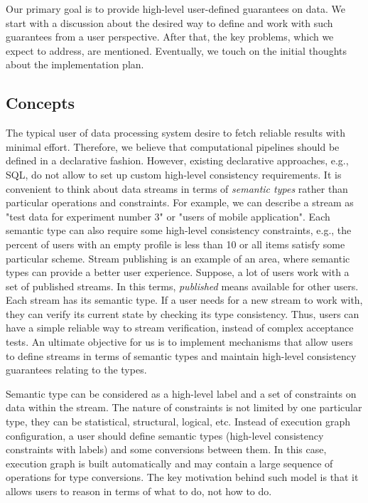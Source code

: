 \label{fs-phd-reliable}

Our primary goal is to provide high-level user-defined guarantees on data. We start with a discussion about the desired way to define and work with such guarantees from a user perspective. After that, the key problems, which we expect to address, are mentioned. Eventually, we touch on the initial thoughts about the implementation plan.

\subsection{Concepts}

The typical user of data processing system desire to fetch reliable results with minimal effort. Therefore, we believe that computational pipelines should be defined in a declarative fashion. However, existing declarative approaches, e.g., SQL, do not allow to set up custom high-level consistency requirements. It is convenient to think about data streams in terms of {\em semantic types} rather than particular operations and constraints. For example, we can describe a stream as "test data for experiment number 3" or "users of mobile application". Each semantic type can also require some high-level consistency constraints, e.g., the percent of users with an empty profile is less than 10 or all items satisfy some particular scheme. Stream publishing is an example of an area, where semantic types can provide a better user experience. Suppose, a lot of users work with a set of published streams. In this terms, {\em published} means available for other users. Each stream has its semantic type. If a user needs for a new stream to work with, they can verify its current state by checking its type consistency. Thus, users can have a simple reliable way to stream verification, instead of complex acceptance tests. An ultimate objective for us is to implement mechanisms that allow users to define streams in terms of semantic types and maintain high-level consistency guarantees relating to the types.

Semantic type can be considered as a high-level label and a set of constraints on data within the stream. The nature of constraints is not limited by one particular type, they can be statistical, structural, logical, etc. Instead of execution graph configuration, a user should define semantic types (high-level consistency constraints with labels) and some conversions between them. In this case, execution graph is built automatically and may contain a large sequence of operations for type conversions. The key motivation behind such model is that it allows users to reason in terms of what to do, not how to do. 


